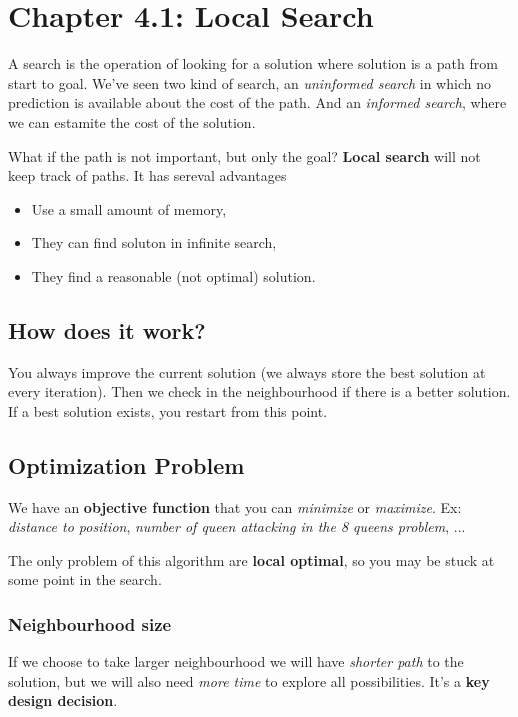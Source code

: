 \section{Chapter 4.1: Local Search}

A search is the operation of looking for a solution where solution is a path from start to goal. We've seen two kind of search, an \textit{uninformed search} in which no prediction is available about the cost of the path. And an \textit{informed search}, where we can estamite the cost of the solution.

What if the path is not important, but only the goal? \textbf{Local search} will not keep track of paths. It has sereval advantages
\begin{itemize}
\item Use a small amount of memory,
\item They can find soluton in infinite search,
\item They find a reasonable (not optimal) solution.
\end{itemize}

\subsection{How does it work?}

You always improve the current solution (we always store the best solution at every iteration). Then we check in the neighbourhood if there is a better solution. If a best solution exists, you restart from this point.

\subsection{Optimization Problem}

We have an \textbf{objective function} that you can \textit{minimize} or \textit{maximize}. Ex: \textit{distance to position}, \textit{number of queen attacking in the 8 queens problem}, ...

The only problem of this algorithm are \textbf{local optimal}, so you may be stuck at some point in the search. 

\subsubsection{Neighbourhood size}

If we choose to take larger neighbourhood we will have \textit{shorter path} to the solution, but we will also need \textit{more time} to explore all possibilities. It's a \textbf{key design decision}.

